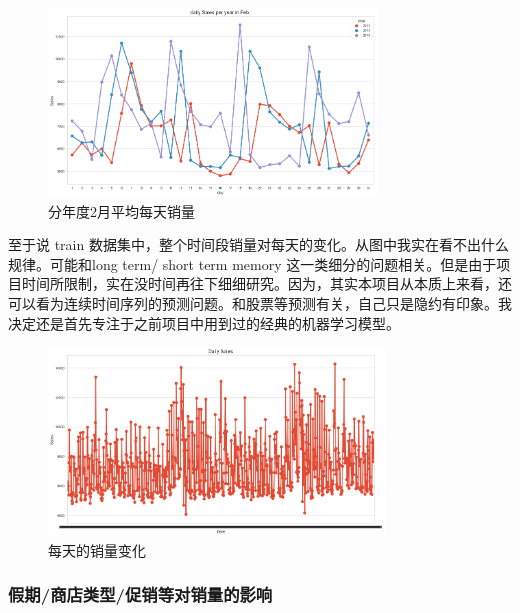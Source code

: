 \documentclass[a4paper]{article}
\begin{document}
\begin{figure}[ht]
 \centering
 \includegraphics[height=5cm]{images/feb-daily-sale.png}
 \caption{分年度2月平均每天销量}
 \label{fig:feb-by-year}
\end{figure}



至于说 train 数据集中，整个时间段销量对每天的变化。从图中我实在看不出什么规律。可能和long term/ short term memory 这一类细分的问题相关。但是由于项目时间所限制，实在没时间再往下细细研究。因为，其实本项目从本质上来看，还可以看为连续时间序列的预测问题。和股票等预测有关，自己只是隐约有印象。我决定还是首先专注于之前项目中用到过的经典的机器学习模型。

\begin{figure}[ht]
 \centering
 \includegraphics[height=5cm]{images/sale-daily.png}
 \caption{每天的销量变化}
 \label{fig:daily}
\end{figure}

\subsubsection{假期/商店类型/促销等对销量的影响}
\end{document}
